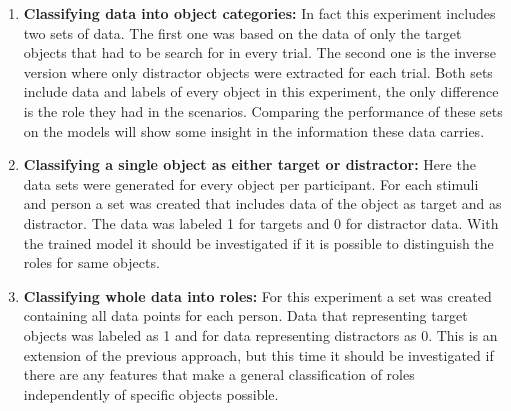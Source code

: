 \begin{enumerate}
	\item \textbf{Classifying data into object categories:} In fact this experiment includes two sets of data. The first one was based on the data of only the target objects that had to be search for in every trial. The second one is the inverse version where only distractor objects were extracted for each trial. Both sets include data and labels of every object in this experiment, the only difference is the role they had in the scenarios. Comparing the performance of these sets on the models will show some insight in the information these data carries. 
	
	\item \textbf{Classifying a single object as either target or distractor:} Here the data sets were generated for every object per participant. For each stimuli and person a set was created that includes data of the object as target and as distractor. The data was labeled 1 for targets and 0 for distractor data. With the trained model it should be investigated if it is possible to distinguish the roles for same objects.   
	
	\item \textbf{Classifying whole data into roles:} For this experiment a set was created containing all data points for each person. Data that representing target objects was labeled as 1 and for data representing distractors as 0. This is an extension of the previous approach, but this time it should be investigated if there are any features that make a general classification of roles independently of specific objects possible.    
\end{enumerate}  

